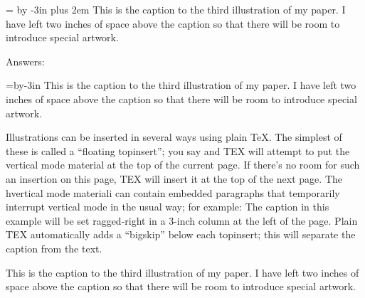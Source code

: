 \topinsert \vskip 2in
\leftskip=\hsize
\advance\leftskip by -3in plus 2em
\parfillskip=0pt
 This is the caption to the
third illustration of my paper. I have left two inches
of space above the caption so that there will be room
to introduce special artwork. \endinsert

\topinsert Answers: \endinsert

\topinsert\vskip2in
\endinsert

\topinsert \vskip 2in
\leftskip=\hsize \advance\leftskip by-3in
 This is the caption to the
third illustration of my paper. I have left two inches
of space above the caption so that there will be room
to introduce special artwork. \endinsert


Illustrations can be inserted in several ways using plain \TeX. The simplest of
these is called a “floating topinsert”; you say and TEX will attempt to put the vertical mode material at the top of the current page.
If there’s no room for such an insertion on this page, TEX will insert it at the top of
the next page. The hvertical mode materiali can contain embedded paragraphs that
temporarily interrupt vertical mode in the usual way; for example:
The caption in this example will be set ragged-right in a 3-inch column at the left of
the page. Plain TEX automatically adds a “bigskip” below each topinsert; this will
separate the caption from the text.

\topinsert \vskip 2in
\hsize=3in \raggedright
{} This is the caption to the
third illustration of my paper. I have left two inches
of space above the caption so that there will be room
to introduce special artwork. \endinsert

\bye

